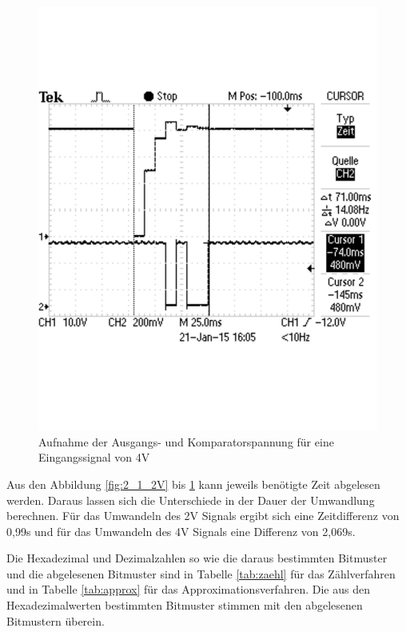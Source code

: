 \documentclass[12pt,a4paper]{article}
\begin{document}
\begin{figure}[H]
  \centering 	
    \includegraphics[trim = 0mm 50mm 0mm 50mm, clip, scale = 0.4]{2_2_4V.pdf}
  	\caption[Aufnahme der Ausgangs- und Komparatorspannung für eine Eingangssignal von 4V]{Aufnahme der Ausgangs- und Komparatorspannung für eine Eingangssignal von 4V} 
  \label{fig:2_2_4V}
\end{figure}


Aus den Abbildung \ref{fig:2_1_2V} bis \ref{fig:2_2_4V} kann jeweils benötigte Zeit abgelesen werden. Daraus lassen sich die Unterschiede in der Dauer der Umwandlung berechnen. Für das Umwandeln des 2V Signals ergibt sich eine Zeitdifferenz von 0,99s und für das Umwandeln des 4V Signals eine Differenz von 2,069s.

Die Hexadezimal und Dezimalzahlen so wie die daraus bestimmten Bitmuster und die abgelesenen Bitmuster sind in Tabelle \ref{tab:zaehl} für das Zählverfahren und in Tabelle \ref{tab:approx} für das Approximationsverfahren. Die aus den Hexadezimalwerten bestimmten Bitmuster stimmen mit den abgelesenen Bitmustern überein.
\end{document}
